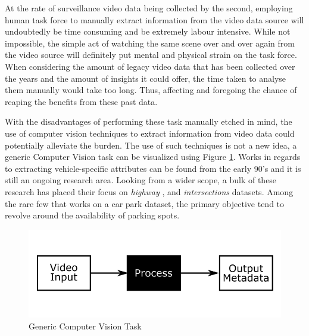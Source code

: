 
At the rate of surveillance video data being collected by the second, employing human task force to manually extract information from the video data source will undoubtedly be time consuming and be extremely labour intensive.
While not impossible, the simple act of watching the same scene over and over again from the video source will definitely put mental and physical strain on the task force. When considering the amount of legacy video data that has been collected over the years and the amount of insights it could offer, the time taken to analyse them manually would take too long. Thus, affecting and foregoing the chance of reaping the benefits from these past data.

With the disadvantages of performing these task manually etched in mind, the use of computer vision techniques to extract information from video data could potentially alleviate the burden. The use of such techniques is not a new idea, a generic Computer Vision task can be visualized using Figure \ref{fig:genericCV}. Works in regards to extracting vehicle-specific attributes can be found from the early 90's and it is still an ongoing research area. Looking from a wider scope, a bulk of these research has placed their focus on \textit{highway} \cite{yu2017improved, cao2016vehicle, arya2016real, liu2016highway, al2016adaptive}, and  \textit{intersections} \cite{meng2017traffic, choong2017modeling, ren2018learning} datasets. Among the rare few \cite{shi2017study, marmol2016quickspot, ling2017identifying} that works on a car park dataset, the primary objective tend to revolve around the availability of parking spots.

\begin{figure}[!hbt]\centering
\includegraphics[width=.8\textwidth]{image/general/simpleframe.png}
\caption{Generic Computer Vision Task}
\label{fig:genericCV}
\end{figure}

